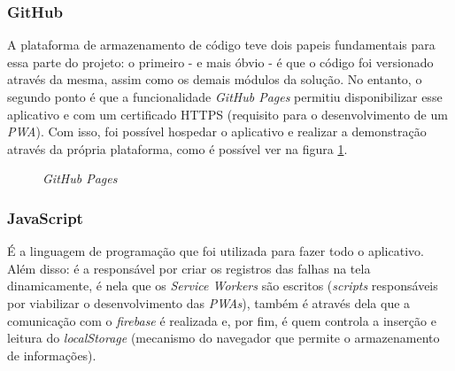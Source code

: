 \subsubsection{GitHub}
\label{subsubsec:github}

A plataforma de armazenamento de código teve dois papeis fundamentais para essa parte do projeto: o primeiro - e mais óbvio - é que o código foi versionado através da mesma, assim como os demais módulos da solução. No entanto, o segundo ponto é que a funcionalidade \textit{GitHub Pages} permitiu disponibilizar esse aplicativo \online{} e com um certificado HTTPS (requisito para o desenvolvimento de um \textit{PWA}). Com isso, foi possível hospedar o aplicativo e realizar a demonstração através da própria plataforma, como é possível ver na figura \ref{fig:github_pages}.

\begin{figure}[H]
    \centering
    \caption{\textit{GitHub Pages}}
    \label{fig:github_pages}
\end{figure}


\subsubsection{JavaScript}
\label{subsubsec:javascript}

É a linguagem de programação que foi utilizada para fazer todo o aplicativo. Além disso: é a responsável por criar os registros das falhas na tela dinamicamente, é nela que os \textit{Service Workers} são escritos (\textit{scripts} responsáveis por viabilizar o desenvolvimento das \textit{PWAs}), também é através dela que a comunicação com o \textit{firebase} é realizada e, por fim, é quem controla a inserção e leitura do \textit{localStorage} (mecanismo do navegador que permite o armazenamento de informações).

